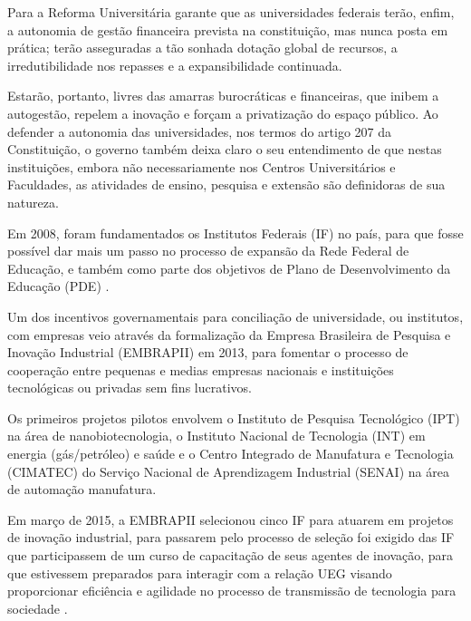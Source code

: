 Para  a Reforma Universitária garante que as universidades federais terão, enfim, a autonomia de gestão financeira prevista na constituição, mas nunca posta em prática; terão asseguradas a tão sonhada dotação global de recursos, a irredutibilidade nos repasses e a expansibilidade continuada.

Estarão, portanto, livres das amarras burocráticas e financeiras, que inibem a autogestão, repelem a inovação e forçam a privatização do espaço público. Ao defender a autonomia das universidades, nos termos do artigo 207 da Constituição, o governo também deixa claro o seu entendimento de que nestas instituições, embora não necessariamente nos Centros Universitários e Faculdades, as atividades de ensino, pesquisa e extensão são definidoras de sua natureza.

Em 2008, foram fundamentados os Institutos Federais (IF) no país, para que fosse possível dar mais um passo no processo de expansão da Rede Federal de Educação, e também como parte dos objetivos de Plano de Desenvolvimento da Educação (PDE) \cite{brasil2012ntextordmasculine, otranto2010criaccao}.

Um dos incentivos governamentais para conciliação de universidade, ou institutos, com empresas veio através da formalização da Empresa Brasileira de Pesquisa e Inovação Industrial (EMBRAPII) em 2013, para fomentar o processo de cooperação entre pequenas  e medias empresas nacionais e instituições tecnológicas ou privadas sem fins lucrativos.

Os primeiros projetos pilotos envolvem o Instituto de Pesquisa Tecnológico (IPT) na área de nanobiotecnologia, o Instituto Nacional de Tecnologia (INT) em energia (gás/petróleo) e saúde e o Centro Integrado de Manufatura e Tecnologia (CIMATEC) do Serviço Nacional de Aprendizagem Industrial (SENAI) na área de automação manufatura.

Em março de 2015, a EMBRAPII selecionou cinco IF para atuarem em projetos de inovação industrial, para passarem pelo processo de seleção foi exigido das IF que participassem de um curso de capacitação de seus agentes de inovação, para que estivessem preparados para interagir com a relação UEG visando proporcionar eficiência  e agilidade no processo de transmissão de tecnologia para sociedade \cite{embrapiiff}.

